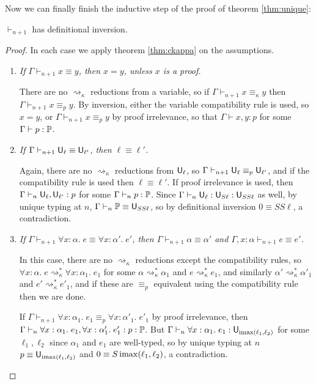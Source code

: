 Now we can finally finish the inductive step of the proof of theorem \ref{thm:unique}:

\begin{theorem}\label{thm:1dinv}
$\vdash_{n+1}$ has definitional inversion.
\end{theorem}
\begin{proof}
In each case we apply theorem \ref{thm:ckappa} on the assumptions.
\begin{enumerate}
\item\emph{If $\Gamma\vdash_{n+1} x\equiv y$, then $x=y$, unless $x$ is a proof.}

There are no $\rightsquigarrow_\kappa$ reductions from a variable, so if $\Gamma\vdash_{n+1} x\equiv_\kappa y$ then $\Gamma\vdash_{n+1} x\equiv_p y$. By inversion, either the variable compatibility rule is used, so $x=y$, or $\Gamma\vdash_{n+1} x\equiv_p y$ by proof irrelevance, so that $\Gamma\vdash x,y:p$ for some $\Gamma\vdash p:\P$.

\item \emph{If $\Gamma\vdash_{n+1} \U_\ell\equiv\U_{\ell'}$, then $\ell\equiv\ell'$.}

Again, there are no $\rightsquigarrow_\kappa$ reductions from $\mathsf{U}_\ell$, so $\Gamma\vdash_{n+1} \U_\ell\equiv_p\U_{\ell'}$, and if the compatibility rule is used then $\ell\equiv\ell'$. If proof irrelevance is used, then $\Gamma\vdash_n\U_\ell,\U_{\ell'}:p$ for some $\Gamma\vdash_n p:\P$. Since $\Gamma\vdash_n\U_\ell:\U_{S\ell}:\U_{SS\ell}$ as well, by unique typing at $n$, $\Gamma\vdash_n \P\equiv \U_{SS\ell}$, so by definitional inversion $0\equiv SS\ell$, a contradiction.

\item \emph{If $\Gamma\vdash_{n+1} \forall x:\alpha.\;e\equiv\forall x:\alpha'.\;e'$, then $\Gamma\vdash_{n+1} \alpha\equiv\alpha'$ and $\Gamma,x:\alpha\vdash_{n+1} e\equiv e'$.}

In this case, there are no $\rightsquigarrow_\kappa$ reductions except the compatibility rules, so $\forall x:\alpha.\;e\rightsquigarrow_\kappa^*\forall x:\alpha_1.\;e_1$ for some $\alpha\rightsquigarrow_\kappa^*\alpha_1$ and $e\rightsquigarrow_\kappa^*e_1$, and similarly $\alpha'\rightsquigarrow_\kappa^*\alpha'_1$ and $e'\rightsquigarrow_\kappa^*e'_1$, and if these are $\equiv_p$ equivalent using the compatibility rule then we are done.

If $\Gamma\vdash_{n+1}\forall x:\alpha_1.\;e_1\equiv_p\forall x:\alpha'_1.\;e'_1$ by proof irrelevance, then $\Gamma\vdash_n\forall x:\alpha_1.\;e_1,\forall x:\alpha'_1.\;e'_1:p:\P$. But $\Gamma\vdash_n\forall x:\alpha_1.\;e_1:\U_{\imax(\ell_1,\ell_2)}$ for some $\ell_1,\ell_2$ since $\alpha_1$ and $e_1$ are well-typed, so by unique typing at $n$ $p\equiv\mathsf{U}_{\operatorname{imax}(\ell_1,\ell_2)}$ and $0\equiv S\operatorname{imax}(\ell_1,\ell_2)$, a contradiction.


\end{enumerate}
\end{proof}
